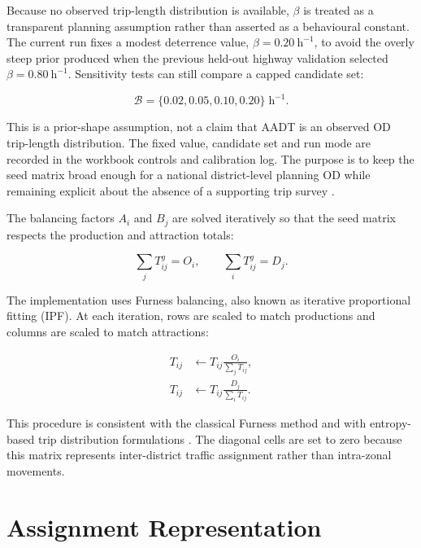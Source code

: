 \documentclass[11pt,a4paper]{article}
\begin{document}
Because no observed trip-length distribution is available, $\beta$ is treated
as a transparent planning assumption rather than asserted as a behavioural
constant. The current run fixes a modest deterrence value,
$\beta=0.20~\mathrm{h}^{-1}$, to avoid the overly steep prior produced when the
previous held-out highway validation selected $\beta=0.80~\mathrm{h}^{-1}$.
Sensitivity tests can still compare a capped candidate set:

\begin{equation}
\mathcal{B}=\{0.02,0.05,0.10,0.20\}\;\mathrm{h}^{-1}.
\label{eq:beta-selection}
\end{equation}

This is a prior-shape assumption, not a claim that AADT is an observed OD
trip-length distribution. The fixed value, candidate set and run mode are
recorded in the workbook controls and calibration log. The purpose is to keep
the seed matrix broad enough for a national district-level planning OD while
remaining explicit about the absence of a supporting trip survey
\cite{ortuzar2011}.

The balancing factors $A_i$ and $B_j$ are solved iteratively so that the seed
matrix respects the production and attraction totals:

\begin{equation}
\sum_j T^{g}_{ij}=O_i, \qquad \sum_i T^{g}_{ij}=D_j.
\label{eq:constraints}
\end{equation}

The implementation uses Furness balancing, also known as iterative proportional
fitting (IPF). At each iteration, rows are scaled to match productions and
columns are scaled to match attractions:

\begin{align}
T_{ij} &\leftarrow T_{ij}\frac{O_i}{\sum_j T_{ij}}, \\
T_{ij} &\leftarrow T_{ij}\frac{D_j}{\sum_i T_{ij}}.
\end{align}

This procedure is consistent with the classical Furness method
\cite{furness1965} and with entropy-based trip distribution formulations
\cite{wilson1967,morphet1975,ortuzar2011}. The diagonal cells are set to zero
because this matrix represents inter-district traffic assignment rather than
intra-zonal movements.

\section{Assignment Representation}
\end{document}
